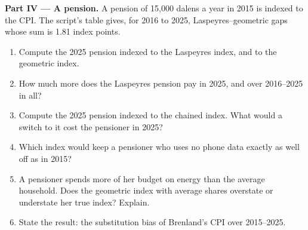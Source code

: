 \begin{problem}
\medskip\noindent\textbf{Part IV --- A pension.} A pension of 15,000 dalens a
year in 2015 is indexed to the CPI. The script's table gives, for 2016 to
2025, Laspeyres--geometric gaps whose sum is 1.81 index points. %
\begin{enumerate}[resume]
  \item Compute the 2025 pension indexed to the Laspeyres index, and to the geometric index.
  \item How much more does the Laspeyres pension pay in 2025, and over 2016--2025 in all?
  \item Compute the 2025 pension indexed to the chained index. What would a switch to it cost the pensioner in 2025?
  \item Which index would keep a pensioner who uses no phone data exactly as well off as in 2015?
  \item A pensioner spends more of her budget on energy than the average household. Does the geometric index with average shares overstate or understate her true index? Explain.
  \item State the result: the substitution bias of Brenland's CPI over 2015--2025.
\end{enumerate}
\end{problem}
